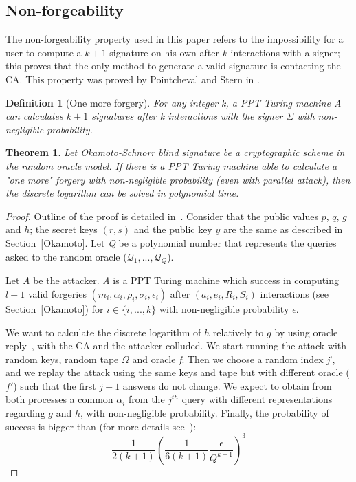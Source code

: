 \documentclass[conference]{IEEEtran}
\newtheorem{definition}{Definition}
\newtheorem{theorem}{Theorem}
\newtheorem{proof}{Proof}
\begin{document}
\subsection{Non-forgeability}
The non-forgeability property used in this paper refers to the impossibility for a user to compute a $k+1$ signature on his own after $k$ interactions with a signer; this proves that the only method to generate a valid signature is contacting the CA. This property was proved by Pointcheval and Stern in \cite{pointcheval1996provably}.

\begin{definition}[One more forgery]
For any integer \textit{k}, a PPT Turing machine \textit{A} can calculates $k+1$ signatures after \textit{k} interactions with the signer $\Sigma$ with non-negligible probability.  
\end{definition}

\begin{theorem}
Let Okamoto-Schnorr blind signature be a cryptographic scheme in the random oracle model. If there is a PPT Turing machine able to calculate a "one more" forgery with non-negligible probability (even with parallel attack), then the discrete logarithm can be solved in polynomial time.
\end{theorem}

\begin{proof}
Outline of the proof is detailed in~\cite{pointcheval1996provably}.
Consider that the public values $p$, $q$, $g$ and $h$; the secret keys $(r,s)$ and the public key $y$ are the same as described in Section~\ref{Okamoto}. Let \textit{Q} be a polynomial number that represents the queries asked to the random oracle ($\mathcal{Q}_1,...,\mathcal{Q}_Q$).

Let \textit{A} be the attacker. \textit{A} is a PPT Turing machine which success in computing  $l+1$ valid forgeries $(m_i,\alpha_i,\rho_i,\sigma_i,\epsilon_i)$ after $(a_i,e_i,R_i,S_i)$ interactions (see Section~\ref{Okamoto}) for $i\in\{i,...,k\}$ with non-negligible probability $\epsilon$.

We want to calculate the  discrete logarithm of $h$ relatively to $g$ by using oracle reply~\cite{10.1007/3-540-68339-9_33}, with the CA and the attacker colluded. We start running the attack with random keys, random tape $\Omega$ and oracle \textit{f}. Then we choose a random index \textit{j}', and we replay the attack using the same keys and tape but with different oracle ($f'$) such that the first $j-1$ answers do not change. We expect to obtain from both processes a common $\alpha_i$ from the $j^{th}$ query with different representations regarding $g$ and $h$, with non-negligible probability. Finally, the probability of success is bigger than (for more details see~\cite{pointcheval1996provably}):
\begin{equation}
    \frac{1}{2(k+1)}\left(\frac{1}{6(k+1)}\frac{\epsilon}{Q^{k+1}}\right)^3
\end{equation}
\end{proof}
\end{document}
